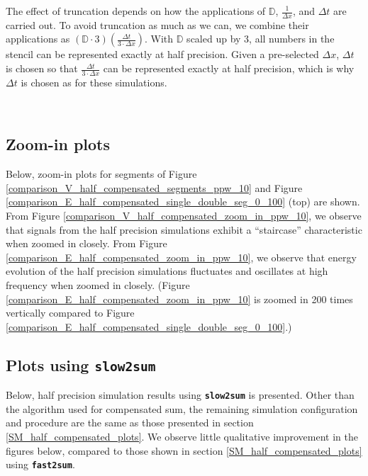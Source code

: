 The effect of truncation depends on how the applications of $\mathbb D$, $\frac{1}{\Delta x}$, and $\Delta t$ are carried out.
%
To avoid truncation as much as we can, we combine their applications as $(\mathbb D \cdot 3) (\frac{\Delta t}{3 \cdot \Delta x})$. With $\mathbb D$ scaled up by 3, all numbers in the stencil can be represented exactly at half precision.
%
Given a pre-selected $\Delta x$, $\Delta t$ is chosen so that $\frac{\Delta t}{3 \cdot \Delta x}$ can be represented exactly at half precision, which is why $\Delta t$ is chosen as  for these simulations.


\ \newline
\ \newline
\ \newline



\subsection{Zoom-in plots}\label{SM_half_compensated_zoom_in}
%
Below, zoom-in plots for segments of Figure \ref{comparison_V_half_compensated_segments_ppw_10} and Figure \ref{comparison_E_half_compensated_single_double_seg_0_100} (top) are shown.
%
From Figure \ref{comparison_V_half_compensated_zoom_in_ppw_10}, we observe that signals from the half precision simulations exhibit a ``staircase'' characteristic when zoomed in closely.
%
From Figure \ref{comparison_E_half_compensated_zoom_in_ppw_10}, we observe that energy evolution of the half precision simulations fluctuates and oscillates at high frequency when zoomed in closely. (Figure \ref{comparison_E_half_compensated_zoom_in_ppw_10} is zoomed in 200 times vertically compared to Figure \ref{comparison_E_half_compensated_single_double_seg_0_100}.)




\subsection{Plots using \textbf{\texttt{\small slow2sum}}}\label{SM_half_compensated_slow2sum}
%
Below, half precision simulation results using \textbf{\texttt{\small slow2sum}} is presented. 
%
Other than the algorithm used for compensated sum, the remaining simulation configuration and procedure are the same as those presented in section \ref{SM_half_compensated_plots}.
%
We observe little qualitative improvement in the figures below, compared to those shown in section \ref{SM_half_compensated_plots} using \textbf{\texttt{\small fast2sum}}.


